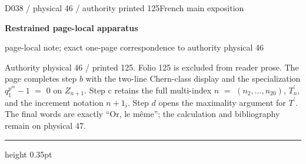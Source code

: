\documentclass[9pt]{article}
\newcommand{\CanonText}[1]{\par{\fontsize{8.0}{9.35}\selectfont\RaggedRight #1\par}\vspace{2.2pt}}
\newcommand{\LayerTitle}{Restrained page-local apparatus}
\begin{document}
\noindent\begin{minipage}[t][\dimexpr\textheight-5pt\relax][t]{\textwidth}
{\sffamily\fontsize{7.3}{8.2}\selectfont\color{Quiet} D038 / physical 46 / authority printed 125\hfill French main exposition}
\par{}\vspace{4.5pt}
{\sffamily\fontsize{10.4}{11.6}\selectfont\bfseries\color{Accent} \LayerTitle}
\par{\sffamily\fontsize{6.7}{7.7}\selectfont\color{Quiet} page-local note; exact one-page correspondence to authority physical 46}
\vspace{5pt}
\CanonText{Authority physical 46 / printed 125. Folio 125 is excluded from reader prose. The page completes step \(b\) with the two-line Chern-class display and the specialization \(q_{1}^{p^{m}}-1\) \(=\) 0 on \(Z_{n+1}\). Step c retains the full multi-index \(n\) \(=\) \((n_{2},\ldots{},n_{20})\), \(T^{\prime}_{n}\), and the increment notation \(n+1_{i}\). Step \(d\) opens the maximality argument for \(T^{\prime}\). The final words are exactly “Or, le même”; the calculation and bibliography remain on physical 47.}
\vfill
{\color{Accent}\hrule height 0.35pt}\vspace{3pt}
\end{minipage}
\newpage
\end{document}

